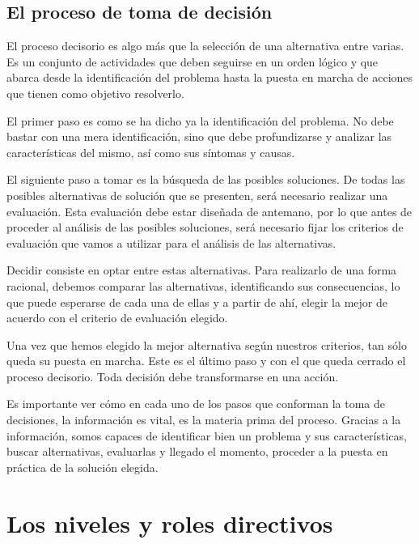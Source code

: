 \documentclass[
]{krantz}
\begin{document}
\hypertarget{el-proceso-de-toma-de-decisiuxf3n}{%
\subsection{El proceso de toma de decisión}\label{el-proceso-de-toma-de-decisiuxf3n}}

El proceso decisorio es algo más que la selección de una alternativa entre varias. Es un conjunto de actividades que deben seguirse en un orden lógico y que abarca desde la identificación del problema hasta la puesta en marcha de acciones que tienen como objetivo resolverlo.

El primer paso es como se ha dicho ya la identificación del problema. No debe bastar con una mera identificación, sino que debe profundizarse y analizar las características del mismo, así como sus síntomas y causas.

El siguiente paso a tomar es la búsqueda de las posibles soluciones. De todas las posibles alternativas de solución que se presenten, será necesario realizar una evaluación. Esta evaluación debe estar diseñada de antemano, por lo que antes de proceder al análisis de las posibles soluciones, será necesario fijar los criterios de evaluación que vamos a utilizar para el análisis de las alternativas.

Decidir consiste en optar entre estas alternativas. Para realizarlo de una forma racional, debemos comparar las alternativas, identificando sus consecuencias, lo que puede esperarse de cada una de ellas y a partir de ahí, elegir la mejor de acuerdo con el criterio de evaluación elegido.

Una vez que hemos elegido la mejor alternativa según nuestros criterios, tan sólo queda su puesta en marcha. Este es el último paso y con el que queda cerrado el proceso decisorio. Toda decisión debe transformarse en una acción.

Es importante ver cómo en cada uno de los pasos que conforman la toma de decisiones, la información es vital, es la materia prima del proceso. Gracias a la información, somos capaces de identificar bien un problema y sus características, buscar alternativas, evaluarlas y llegado el momento, proceder a la puesta en práctica de la solución elegida.

\hypertarget{los-niveles-y-roles-directivos}{%
\section{Los niveles y roles directivos}\label{los-niveles-y-roles-directivos}}
\end{document}

